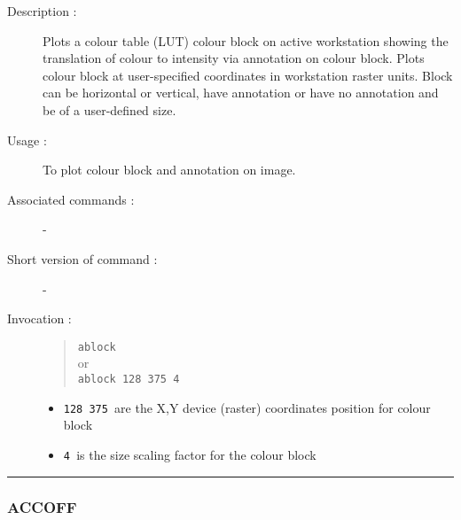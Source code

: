 \begin{description}

\item[Description :] Plots a colour table (LUT) colour block on active
workstation showing the translation of colour to intensity via annotation
on colour block.  Plots colour block at user-specified coordinates in
workstation raster units.  Block can be horizontal or vertical, have
annotation or have no annotation and be of a user-defined size.

\item[Usage :] To plot colour block and annotation on image.
\item[Associated commands :] -
\item[Short version of command :] -
\item[Invocation :]

\begin{quote}{\tt ablock} \\
or \\
{\tt ablock 128 375 4 }
\end{quote}

\begin{itemize}

\item {\tt 128 375 }\/are the X,Y device (raster) coordinates position
for colour block

\item {\tt 4 }\/is the size scaling factor for the colour block

\end{itemize}

\end{description}

\hrule
\subsubsection*{\label{ACCOFF}ACCOFF}

